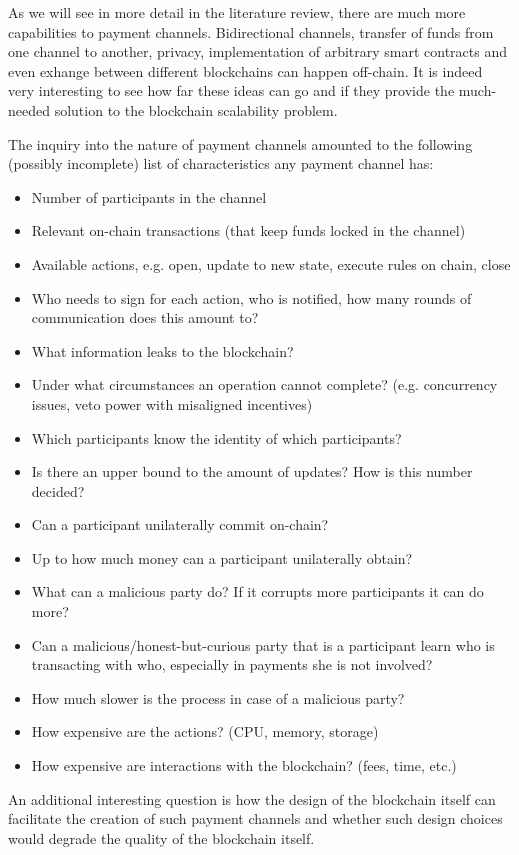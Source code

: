   As we will see in more detail in the literature review, there are much more capabilities
  to payment channels. Bidirectional channels, transfer of funds from one channel to
  another, privacy, implementation of arbitrary smart contracts and even exhange between
  different blockchains can happen off-chain. It is indeed very interesting to see how far
  these ideas can go and if they provide the much-needed solution to the blockchain
  scalability problem.

  The inquiry into the nature of payment channels amounted to the following (possibly
  incomplete) list of characteristics any payment channel has:
  \begin{itemize}
    \item Number of participants in the channel
    \item Relevant on-chain transactions (that keep funds locked in the channel)
    \item Available actions, e.g. open, update to new state, execute rules on chain, close
    \item Who needs to sign for each action, who is notified, how many rounds of
    communication does this amount to?
    \item What information leaks to the blockchain?
    \item Under what circumstances an operation cannot complete? (e.g. concurrency issues,
    veto power with misaligned incentives)
    \item Which participants know the identity of which participants?
    \item Is there an upper bound to the amount of updates? How is this number decided?
    \item Can a participant unilaterally commit on-chain?
    \item Up to how much money can a participant unilaterally obtain?
    \item What can a malicious party do? If it corrupts more participants it can do more?
    \item Can a malicious/honest-but-curious party that is a participant learn who is
    transacting with who, especially in payments she is not involved?
    \item How much slower is the process in case of a malicious party?
    \item How expensive are the actions? (CPU, memory, storage)
    \item How expensive are interactions with the blockchain? (fees, time, etc.)
  \end{itemize}

  An additional interesting question is how the design of the blockchain itself can
  facilitate the creation of such payment channels and whether such design choices would
  degrade the quality of the blockchain itself.
